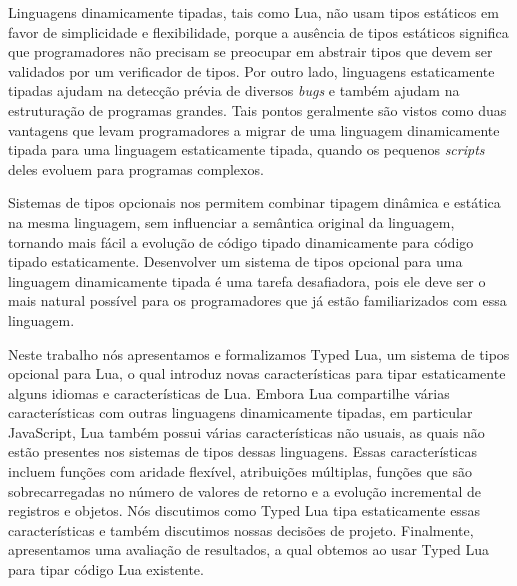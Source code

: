 Linguagens dinamicamente tipadas, tais como Lua, não usam tipos estáticos em
favor de simplicidade e flexibilidade, porque a ausência de tipos estáticos
significa que programadores não precisam se preocupar em abstrair tipos que
devem ser validados por um verificador de tipos.
Por outro lado, linguagens estaticamente tipadas ajudam na detecção prévia de
diversos \emph{bugs} e também ajudam na estruturação de programas grandes.
Tais pontos geralmente são vistos como duas vantagens que levam programadores
a migrar de uma linguagem dinamicamente tipada para uma linguagem estaticamente tipada,
quando os pequenos \emph{scripts} deles evoluem para programas complexos.

Sistemas de tipos opcionais nos permitem combinar tipagem dinâmica e estática na
mesma linguagem, sem influenciar a semântica original da linguagem, tornando mais
fácil a evolução de código tipado dinamicamente para código tipado estaticamente.
Desenvolver um sistema de tipos opcional para uma linguagem dinamicamente tipada é
uma tarefa desafiadora, pois ele deve ser o mais natural possível para os programadores
que já estão familiarizados com essa linguagem.

Neste trabalho nós apresentamos e formalizamos Typed Lua, um sistema de tipos opcional
para Lua, o qual introduz novas características para tipar estaticamente alguns idiomas
e características de Lua.
Embora Lua compartilhe várias características com outras linguagens dinamicamente
tipadas, em particular JavaScript, Lua também possui várias características não usuais,
as quais não estão presentes nos sistemas de tipos dessas linguagens.
Essas características incluem funções com aridade flexível, atribuições múltiplas,
funções que são sobrecarregadas no número de valores de retorno e
a evolução incremental de registros e objetos.
Nós discutimos como Typed Lua tipa estaticamente essas características e
também discutimos nossas decisões de projeto.
Finalmente, apresentamos uma avaliação de resultados,
a qual obtemos ao usar Typed Lua para tipar código Lua existente.
